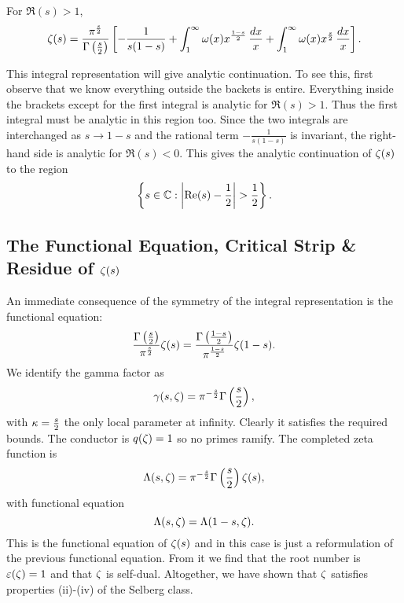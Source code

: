       \begin{theorem}
        For $\Re(s) > 1$,
        \[
          \zeta(s) = \frac{\pi^{\frac{s}{2}}}{\Gamma\left(\frac{s}{2}\right)}\left[-\frac{1}{s(1-s)}+\int_{1}^{\infty}\omega(x)x^{\frac{1-s}{2}}\,\frac{dx}{x}+\int_{1}^{\infty}\omega(x)x^{\frac{s}{2}}\,\frac{dx}{x}\right].
        \]
      \end{theorem}

      This integral representation will give analytic continuation. To see this, first observe that we know everything outside the backets is entire. Everything inside the brackets except for the first integral is analytic for $\Re(s) > 1$. Thus the first integral must be analytic in this region too. Since the two integrals are interchanged as $s \to 1-s$ and the rational term $-\frac{1}{s(1-s)}$ is invariant, the right-hand side is analytic for $\Re(s) < 0$. This gives the analytic continuation of $\zeta(s)$ to the region
      \[
        \left\{s \in \mathbb{C}:\left|\mathrm{Re}(s)-\frac{1}{2}\right| > \frac{1}{2}\right\}.
      \]
    \subsection*{The Functional Equation, Critical Strip \& Residue of \texorpdfstring{$\zeta(s)$}{\z(s)}}
      An immediate consequence of the symmetry of the integral representation is the functional equation:
      \[
        \frac{\Gamma\left(\frac{s}{2}\right)}{\pi^{\frac{s}{2}}}\zeta(s) = \frac{\Gamma\left(\frac{1-s}{2}\right)}{\pi^{\frac{1-s}{2}}}\zeta(1-s).
      \]
      We identify the gamma factor as
      \[
        \gamma(s,\zeta) = \pi^{-\frac{s}{2}}\Gamma\left(\frac{s}{2}\right),
      \]
      with $\kappa = \frac{s}{2}$ the only local parameter at infinity. Clearly it satisfies the required bounds. The conductor is $q(\zeta) = 1$ so no primes ramify. The completed zeta function is
      \[
        \Lambda(s,\zeta) = \pi^{-\frac{s}{2}}\Gamma\left(\frac{s}{2}\right)\zeta(s),
      \]
      with functional equation
      \[
        \Lambda(s,\zeta) = \Lambda(1-s,\zeta).
      \]
      This is the functional equation of $\zeta(s)$ and in this case is just a reformulation of the previous functional equation. From it we find that the root number is $\varepsilon(\zeta) = 1$ and that $\zeta$ is self-dual. Altogether, we have shown that $\zeta$ satisfies properties (ii)-(iv) of the Selberg class.

